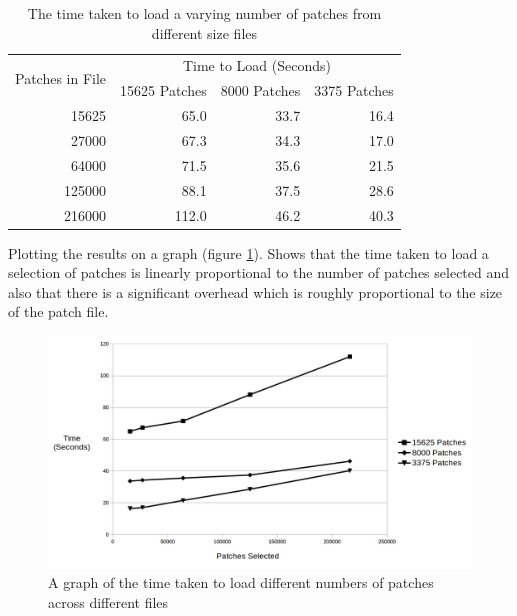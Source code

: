\documentclass[12pt,a4paper]{article}
\begin{document}
\begin{table}[h]
\centering
\begin{tabular}{rrrr}
\hline
\multicolumn{1}{l}{\multirow{2}{*}{Patches in File}} & \multicolumn{3}{c}{Time to Load (Seconds)}                                                              \\
\multicolumn{1}{l}{}                                 & \multicolumn{1}{l}{15625 Patches} & \multicolumn{1}{l}{8000 Patches} & \multicolumn{1}{l}{3375 Patches} \\ \hline
15625                                                & 65.0                              & 33.7                             & 16.4                             \\
27000                                                & 67.3                              & 34.3                             & 17.0                             \\
64000                                                & 71.5                              & 35.6                             & 21.5                             \\
125000                                               & 88.1                              & 37.5                             & 28.6                             \\
216000                                               & 112.0                             & 46.2                             & 40.3                            
\end{tabular}
\caption{The time taken to load a varying number of patches from different size files}
\label{explore-graph}
\end{table}

Plotting the results on a graph (figure \ref{explore-graph}). Shows that the time taken to load a selection of patches is linearly proportional to the number of patches selected and also that there is a significant overhead which is roughly proportional to the size of the patch file.

\begin{figure}[h]
\centering
\includegraphics[scale=0.6]{area-select-graph}
\caption{A graph of the time taken to load different numbers of patches across different files}
\label{explore-graph}
\end{figure}
\end{document}
